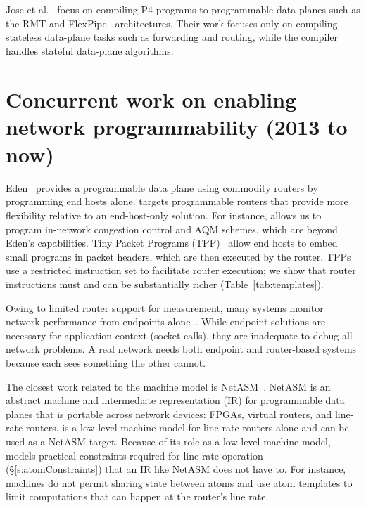 Jose et al.~\cite{lavanya_compiler} focus on compiling P4 programs to
programmable data planes such as the RMT and FlexPipe~\cite{flexpipe} architectures. Their work
focuses only on compiling stateless data-plane tasks such as forwarding and
routing, while the \pktlanguage compiler handles stateful data-plane
algorithms.

\section{Concurrent work on enabling network programmability (2013 to now)}

Eden~\cite{eden} provides a programmable data plane using commodity routers by
programming end hosts alone. \pktlanguage targets programmable routers that
provide more flexibility relative to an end-host-only solution. For instance,
\pktlanguage allows us to program in-network congestion control and AQM
schemes, which are beyond Eden's capabilities.  Tiny Packet Programs
(TPP)~\cite{tpp} allow end hosts to embed small programs in packet headers,
which are then executed by the router. TPPs use a restricted instruction set to
facilitate router execution; we show that router instructions must and can be
substantially richer (Table~\ref{tab:templates}).

Owing to limited router support for
measurement, many systems monitor network performance from endpoints
alone~\cite{netpoirot, minlan-snap, dapper-sosr, trumpet, azure-smartnic}.
While endpoint solutions are necessary for application context (\eg socket
calls), they are inadequate to debug all network problems. A real network needs
both endpoint and router-based systems because each sees something the other
cannot.

The closest work related to the \absmachine machine model is
NetASM~\cite{netasm}. NetASM is an abstract machine and intermediate
representation (IR) for programmable data planes that is portable across
network devices: FPGAs, virtual routers, and line-rate routers.  \absmachine
is a low-level machine model for line-rate routers alone and can be used as a
NetASM target. Because of its role as a low-level machine model, \absmachine
models practical constraints required for line-rate operation
(\S\ref{s:atomConstraints}) that an IR like NetASM does not have to. For
instance, \absmachine machines do not permit sharing state between atoms and use
atom templates to limit computations that can happen at the router's line rate.

